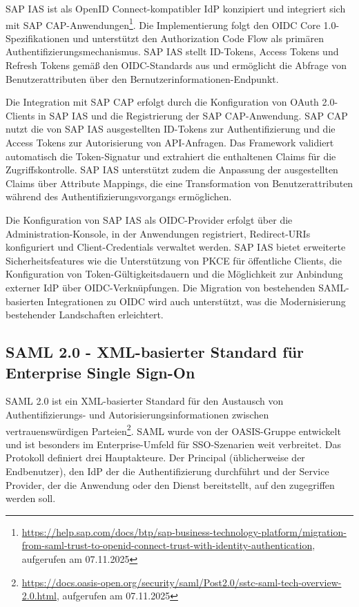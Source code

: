 \ac{SAP IAS} ist als OpenID Connect-kompatibler \ac{IdP} konzipiert und integriert sich mit \ac{SAP CAP}-Anwendungen\footnote{\url{https://help.sap.com/docs/btp/sap-business-technology-platform/migration-from-saml-trust-to-openid-connect-trust-with-identity-authentication}, aufgerufen am 07.11.2025}. Die Implementierung folgt den \ac{OIDC} Core 1.0-Spezifikationen und unterstützt den Authorization Code Flow als primären Authentifizierungsmechanismus. \ac{SAP IAS} stellt ID-Tokens, Access Tokens und Refresh Tokens gemäß den \ac{OIDC}-Standards aus und ermöglicht die Abfrage von Benutzerattributen über den Bernutzerinformationen-Endpunkt.

Die Integration mit \ac{SAP CAP} erfolgt durch die Konfiguration von OAuth 2.0-Clients in \ac{SAP IAS} und die Registrierung der \ac{SAP CAP}-Anwendung. \ac{SAP CAP} nutzt die von \ac{SAP IAS} ausgestellten ID-Tokens zur Authentifizierung und die Access Tokens zur Autorisierung von API-Anfragen. Das Framework validiert automatisch die Token-Signatur und extrahiert die enthaltenen Claims für die Zugriffskontrolle. \ac{SAP IAS} unterstützt zudem die Anpassung der ausgestellten Claims über Attribute Mappings, die eine Transformation von Benutzerattributen während des Authentifizierungsvorgangs ermöglichen.

Die Konfiguration von \ac{SAP IAS} als \ac{OIDC}-Provider erfolgt über die Administration-Konsole, in der Anwendungen registriert, Redirect-URIs konfiguriert und Client-Credentials verwaltet werden. \ac{SAP IAS} bietet erweiterte Sicherheitsfeatures wie die Unterstützung von \ac{PKCE} für öffentliche Clients, die Konfiguration von Token-Gültigkeitsdauern und die Möglichkeit zur Anbindung externer \ac{IdP} über \ac{OIDC}-Verknüpfungen. Die Migration von bestehenden \ac{SAML}-basierten Integrationen zu \ac{OIDC} wird auch unterstützt, was die Modernisierung bestehender Landschaften erleichtert.

\subsection{SAML 2.0 - XML-basierter Standard für Enterprise Single Sign-On}

\ac{SAML} 2.0 ist ein XML-basierter Standard für den Austausch von Authentifizierungs- und Autorisierungsinformationen zwischen vertrauenswürdigen Parteien\footnote{\url{https://docs.oasis-open.org/security/saml/Post2.0/sstc-saml-tech-overview-2.0.html}, aufgerufen am 07.11.2025}. \ac{SAML} wurde von der OASIS-Gruppe entwickelt und ist besonders im Enterprise-Umfeld für \ac{SSO}-Szenarien weit verbreitet. Das Protokoll definiert drei Hauptakteure. Der Principal (üblicherweise der Endbenutzer), den \ac{IdP} der die Authentifizierung durchführt und der Service Provider, der die Anwendung oder den Dienst bereitstellt, auf den zugegriffen werden soll.

